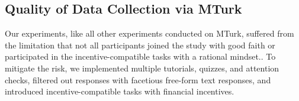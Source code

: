 \subsection{Quality of Data Collection via MTurk}
Our experiments, like all other experiments conducted on MTurk, suffered from the limitation that not all participants joined the study with good faith or participated in the incentive-compatible tasks with a rational mindset.. To mitigate the risk, we implemented multiple tutorials, quizzes, and attention checks, filtered out responses with facetious free-form text responses, and introduced incentive-compatible tasks with financial incentives. 
